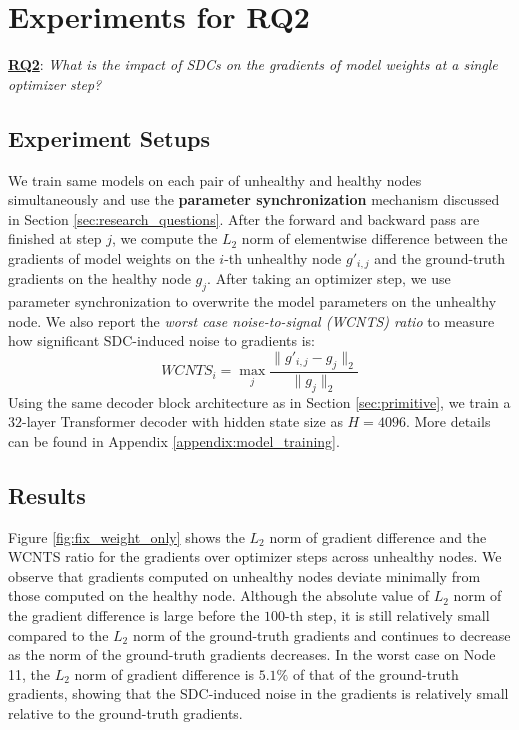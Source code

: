 \section{Experiments for RQ2} \label{sec:sdc_single_optimizer_step}
\underline{\textbf{RQ2}}: \emph{What is the impact of SDCs on the gradients of model weights at a single optimizer step?}

\subsection{Experiment Setups}
\label{methods:differing_gradients}
We train same models on each pair of unhealthy and healthy nodes simultaneously and use the \textbf{parameter synchronization} mechanism discussed in Section \ref{sec:research_questions}. 
After the forward and backward pass are finished  at step $j$, we compute the $L_2$ norm of elementwise difference between the gradients of model weights on the $i$-th unhealthy node $g'_{i,j}$ and the ground-truth gradients on the healthy node $g_{j}$. After taking an optimizer step, we use parameter synchronization to overwrite the model parameters on the unhealthy node. 
We also report the \emph{worst case noise-to-signal (WCNTS) ratio} to measure how significant SDC-induced noise to gradients is:
\begin{equation}
    \label{equation:worst_case_noise_to_signal}
    WCNTS_i = \max_{j}{\frac{\|g'_{i,j} - g_{j} \|_2}{\|g_{j}\|_2}}
\end{equation}
Using the same decoder block architecture as in Section \ref{sec:primitive}, we train a $32$-layer Transformer decoder with hidden state size as $H=4096$. More details can be found in Appendix \ref{appendix:model_training}.

\subsection{Results}
\label{results:model_gradient_norm_diff}

Figure \ref{fig:fix_weight_only} shows the $L_2$ norm of gradient difference and the WCNTS ratio for the gradients over optimizer steps across unhealthy nodes. We observe that gradients computed on unhealthy nodes deviate minimally from those computed on the healthy node. Although the absolute value of $L_2$ norm of the gradient difference is large before the $100$-th step, it is still relatively small compared to the $L_2$ norm of the ground-truth gradients and continues to decrease as the norm of the ground-truth gradients decreases.
In the worst case on Node 11, the $L_2$ norm of gradient difference is $5.1\%$ of that of the ground-truth gradients, showing that the SDC-induced noise in the gradients is relatively small relative to the ground-truth gradients. 

